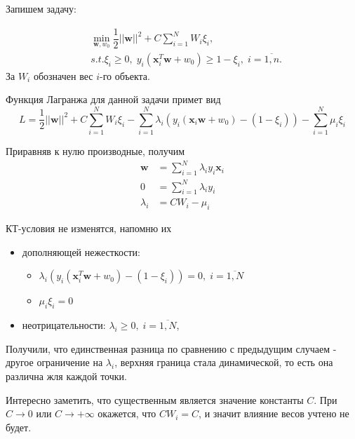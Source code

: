\documentclass[12pt]{article}
\renewcommand{\geq}{\ensuremath{\geqslant}}
\begin{document}
Запишем задачу:

\begin{align*}&
\underset{\mathbf{w}, w_0}{\min} \dfrac{1}{2}||\mathbf{w}||^2 + C\sum_{i=1}^N W_i\xi_i,
\\&s.t. \xi_i \geq 0,\; y_i(\mathbf{x}_i^T\mathbf{w} + w_0) \geq 1 - \xi_i, \; i = \overline{1,n}.
\end{align*}
За $W_i$ обозначен вес  $i$-го объекта.

Функция Лагранжа для данной задачи примет вид 
$$L = \dfrac{1}{2}||\mathbf{w}||^2 + C\sum_{i=1}^NW_i\xi_i - \sum_{i=1}^N\lambda_i(y_i(\mathbf{x}_i\mathbf{w} + w_0) - (1-\xi_i)) - \sum_{i=1}^{N}\mu_i\xi_i$$

Приравняв к нулю производные, получим
\begin{align}
\mathbf{w} &= \sum_{i=1}^{N}\lambda_i y_i \mathbf{x}_i
\\
0 &= \sum_{i=1}^{N}\lambda_i y_i
\\
\lambda_i &= CW_i - \mu_i
\end{align}

КТ-условия не изменятся, напомню их

\begin{itemize}
	
	\item дополняющей нежесткости:
	\begin{itemize}
		\item 
		$\lambda_i(y_i(\mathbf{x}_i^T\mathbf{w} + w_0) - (1-\xi_i)) = 0, \; i = \overline{1,N}$
		\item $\mu_i\xi_i = 0$
	\end{itemize}
	\item неотрицательности: $\lambda_i \geq 0,  \; i = \overline{1,N}$,
	
	
\end{itemize}


Получили, что единственная разница по сравнению с предыдущим случаем - другое ограничение на $\lambda_i$, верхняя граница стала динамической, то есть она различна жля каждой точки.

Интересно заметить, что существенным является значение константы $C$.  При $C \to 0$ или $C \to +\infty$ окажется, что $CW_i = C$, и значит влияние весов учтено не будет. 
\end{document}
